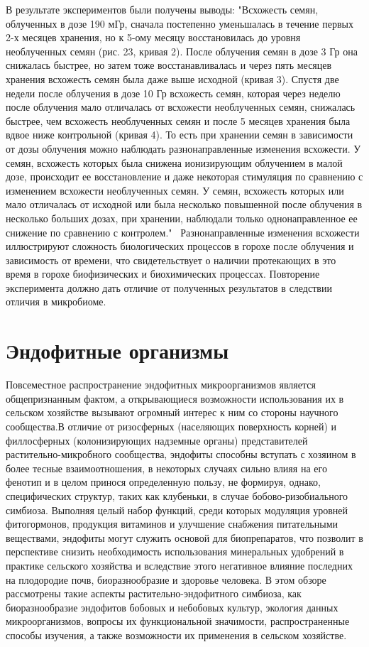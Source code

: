 \documentclass[11pt]{article}
\begin{document}
В результате экспериментов были получены выводы:
"Всхожесть семян, облученных в дозе 190 мГр, сначала постепенно уменьшалась в течение первых 2-х месяцев хранения, но к 5-ому месяцу восстановилась до уровня необлученных семян (рис. 23, кривая 2). После облучения семян в дозе 3 Гр она снижалась быстрее, но затем тоже восстанавливалась и через пять месяцев хранения всхожесть семян была даже выше исходной (кривая 3). Спустя две недели после облучения в дозе 10 Гр всхожесть семян, которая через неделю после облучения мало отличалась от всхожести необлученных семян, снижалась быстрее, чем всхожесть необлученных семян и после 5 месяцев хранения была вдвое ниже контрольной (кривая 4). 
То есть при хранении семян в зависимости от дозы облучения можно наблюдать разнонаправленные изменения всхожести. У семян, всхожесть которых была снижена ионизирующим облучением в малой дозе, происходит ее восстановление и даже некоторая стимуляция по сравнению с изменением всхожести необлученных семян. У семян, всхожесть которых или мало отличалась от исходной или была несколько повышенной после облучения в несколько больших дозах, при хранении, наблюдали только однонаправленное ее снижение по сравнению с контролем."~\cite{andreev_2}
Разнонаправленные изменения всхожести иллюстрируют сложность биологических процессов в горохе после облучения и зависимость от времени, что свидетельствует о наличии протекающих в это время в горохе биофизических и биохимических процессах. Повторение эксперимента должно дать отличие от полученных результатов в следствии отличия в микробиоме.

\section{Эндофитные организмы}
Повсеместное распространение эндофитных микроорганизмов является общепризнанным фактом, а открывающиеся возможности использования их в сельском хозяйстве вызывают огромный интерес к ним со стороны научного сообщества.В отличие от ризосферных (населяющих поверхность корней) и филлосферных (колонизирующих надземные органы) представителей растительно-микробного сообщества, эндофиты способны вступать с хозяином в более тесные взаимоотношения, в некоторых случаях сильно влияя на его фенотип и в целом принося определенную пользу, не формируя, однако, специфических структур, таких как клубеньки, в случае бобово-ризобиального симбиоза. Выполняя целый набор функций, среди которых модуляция уровней фитогормонов, продукция витаминов и улучшение снабжения
питательными веществами, эндофиты могут служить основой для биопрепаратов, что позволит в перспективе снизить необходимость использования минеральных удобрений в практике сельского хозяйства и вследствие этого негативное влияние последних на плодородие почв, биоразнообразие и здоровье человека. В этом обзоре рассмотрены такие аспекты растительно-эндофитного симбиоза, как биоразнообразие эндофитов бобовых и небобовых культур, экология данных микроорганизмов, вопросы их функциональной значимости, распространенные способы изучения, а также возможности их применения в сельском хозяйстве.~\cite{vasileva}
\end{document}
